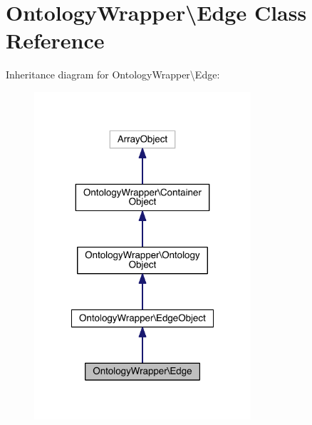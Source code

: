 \hypertarget{class_ontology_wrapper_1_1_edge}{\section{Ontology\-Wrapper\textbackslash{}Edge Class Reference}
\label{class_ontology_wrapper_1_1_edge}
}


Inheritance diagram for Ontology\-Wrapper\textbackslash{}Edge\-:\nopagebreak
\begin{figure}[H]
\begin{center}
\leavevmode
\includegraphics[width=228pt]{class_ontology_wrapper_1_1_edge__inherit__graph}
\end{center}
\end{figure}


